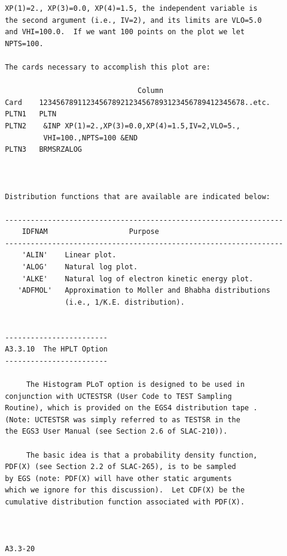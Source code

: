 \newpage {} \begin{verbatim}
 XP(1)=2., XP(3)=0.0, XP(4)=1.5, the independent variable is
 the second argument (i.e., IV=2), and its limits are VLO=5.0
 and VHI=100.0.  If we want 100 points on the plot we let
 NPTS=100.
 
 The cards necessary to accomplish this plot are:
 
                                Column
 Card    123456789112345678921234567893123456789412345678..etc.
 PLTN1   PLTN
 PLTN2    &INP XP(1)=2.,XP(3)=0.0,XP(4)=1.5,IV=2,VLO=5.,
          VHI=100.,NPTS=100 &END
 PLTN3   BRMSRZALOG
 
 
 
 Distribution functions that are available are indicated below:
 
 -----------------------------------------------------------------
     IDFNAM                   Purpose
 -----------------------------------------------------------------
     'ALIN'    Linear plot.
     'ALOG'    Natural log plot.
     'ALKE'    Natural log of electron kinetic energy plot.
    'ADFMOL'   Approximation to Moller and Bhabha distributions
               (i.e., 1/K.E. distribution).
 
 
 ------------------------
 A3.3.10  The HPLT Option
 ------------------------
 
      The Histogram PLoT option is designed to be used in
 conjunction with UCTESTSR (User Code to TEST Sampling
 Routine), which is provided on the EGS4 distribution tape .
 (Note: UCTESTSR was simply referred to as TESTSR in the
 the EGS3 User Manual (see Section 2.6 of SLAC-210)).
 
      The basic idea is that a probability density function,
 PDF(X) (see Section 2.2 of SLAC-265), is to be sampled
 by EGS (note: PDF(X) will have other static arguments
 which we ignore for this discussion).  Let CDF(X) be the
 cumulative distribution function associated with PDF(X).


 
 A3.3-20 
\end{verbatim} 
